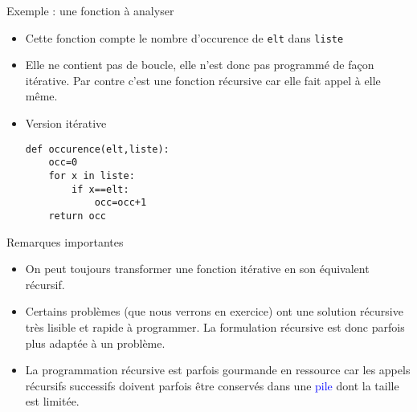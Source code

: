 \documentclass[10pt]{beamer}
\begin{document}
\begin{frame}[fragile]
	\mframe{\Recursivite}
	\begin{exampleblock}{Exemple : une fonction à analyser}
		\begin{itemize}
			\item<2-> \textcolor{OliveGreen}{Cette fonction compte le nombre d'occurence de {\tt elt} dans {\tt liste}}
			\item<3-> \textcolor{OliveGreen}{Elle ne contient pas de boucle, elle n'est donc pas programmé de façon itérative. Par contre c'est une fonction récursive car elle fait appel à elle même.}
			\item<4-> \textcolor{OliveGreen}{Version itérative}
			      \begin{lstlisting}
def occurence(elt,liste):
	occ=0
	for x in liste:
		if x==elt:
			occ=occ+1
	return occ
\end{lstlisting}
		\end{itemize}
	\end{exampleblock}
\end{frame}

\begin{frame}
	\begin{block}{Remarques importantes}
		\begin{itemize}
			\item<2-> On peut toujours transformer une fonction itérative en son équivalent récursif.
			\item<3-> Certains problèmes (que nous verrons en exercice) ont une solution récursive très lisible et rapide à programmer. La formulation récursive est donc parfois \og plus adaptée \fg à un problème.
			\item<4-> La programmation récursive est parfois gourmande en ressource car les appels récursifs successifs doivent parfois être conservés dans une \textcolor{blue}{pile} dont la taille est limitée.
		\end{itemize}
	\end{block}
\end{frame}
\end{document}
